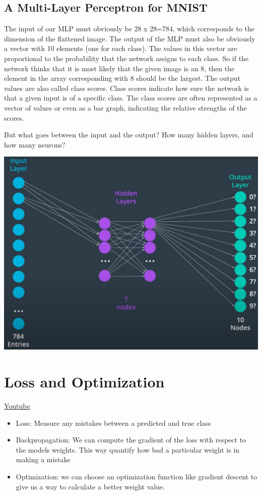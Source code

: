 \subsection{A Multi-Layer Perceptron for MNIST}
The input of our MLP must obviously be 28 x 28=784, which corresponds to the dimension of the flattened image. The output of the MLP must also be obviously a vector with 10 elements (one for each class). The values in this vector are proportional to the probability that the network assigns to each class. So if the network thinks that it is most likely that the given image is an 8, then the element in the array corresponding with 8 should be the largest. The output values are also called class scores. Class scores indicate how sure the network is that a given input is of a specific class. The class scores are often represented as a vector of values or even as a bar graph, indicating the relative strengths of the scores. \newline

But what goes between the input and the output? How many hidden layers, and how many neurons?

\includegraphics[width=0.75\linewidth]{img//cnn/mlp.jpeg}


\section{Loss and Optimization}
\href{https://www.youtube.com/watch?v=583E6aKwQig&ab_channel=Udacity}{Youtube} \newline

\begin{itemize}
    \item Loss: Measure any mistakes between a predicted and true class
    \item Backpropagation: We can compute the gradient of the loss with respect to the models weights. This way quantify how bad a particular weight is in making a mistake
    \item Optimization: we can choose an optimization function like gradient descent to give us a way to calculate a better weight value.
\end{itemize}

